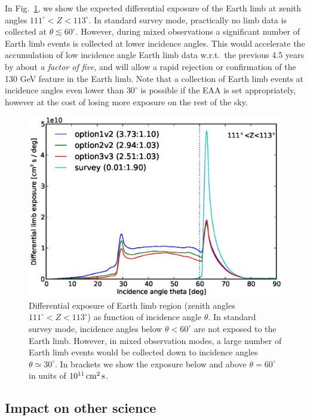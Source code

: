 \documentclass[aps,prd,superscriptaddress,showpacs,nofootinbib,fixlfloat, 12pt]{revtex4-1}
\begin{document}
In Fig.~\ref{fig:limb_exposure}, we show the expected differential exposure of
the Earth limb at zenith angles $111^\circ<Z<113^\circ$. In standard survey
mode, practically no limb data is collected at $\theta\lesssim60^\circ$.
However, during mixed observations a significant number of Earth limb events
is collected at lower incidence angles. This would accelerate the accumulation
of low incidence angle Earth limb data w.r.t.~the previous 4.5 years by about
\emph{a factor of five}, and will allow a rapid rejection or confirmation of
the 130 GeV feature in the Earth limb. Note that a collection of Earth limb
events at incidence angles even lower than $30^\circ$ is possible if the EAA
is set appropriately, however at the cost of losing more exposure on the
rest of the sky.

\begin{figure}[t]
  \begin{center}
    \includegraphics[width=0.6\linewidth]{plots/limb_exposure.eps}
    \vspace{-0.5cm}
  \end{center}
  \caption{Differential exposure of Earth limb region (zenith angles
    $111^\circ<Z<113^\circ$) as function of incidence angle $\theta$. In
    standard survey mode, incidence angles below $\theta<60^\circ$ are not
    exposed to the Earth limb. However, in mixed observation modes, a
    large number of Earth limb events would be collected down to incidence
    angles $\theta\simeq30^\circ$. In brackets we show the exposure below and
  above $\theta=60^\circ$ in units of $10^{11}\rm\,cm^2\,s$.}
  \label{fig:limb_exposure}
\end{figure}


\subsection{Impact on other science}
\end{document}
